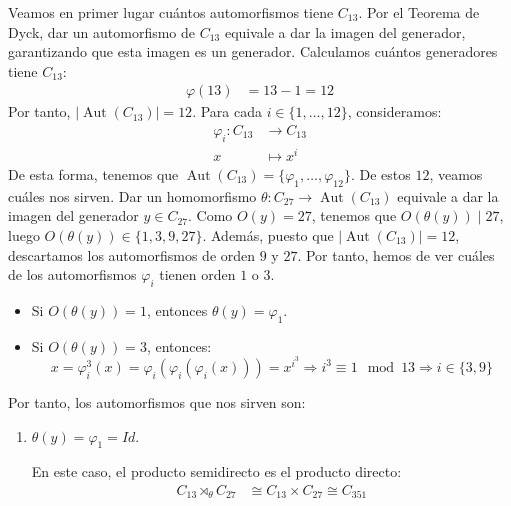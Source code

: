 \documentclass[12pt]{article}
\DeclareMathOperator{\Aut}{Aut}
\begin{document}
\begin{ejercicio}
\begin{enumerate}
            Veamos en primer lugar cuántos automorfismos tiene $C_{13}$. Por el Teorema de Dyck, dar un automorfismo de $C_{13}$ equivale a dar la imagen del generador, garantizando que esta imagen es un generador. Calculamos cuántos generadores tiene $C_{13}$:
            \begin{align*}
                \varphi(13) & = 13-1 = 12
            \end{align*}
            Por tanto, $|\Aut(C_{13})|=12$. Para cada $i\in \{1,\ldots,12\}$, consideramos:
            \begin{align*}
                \varphi_i:C_{13} & \to C_{13} \\
                x & \mapsto x^i
            \end{align*}
            De esta forma, tenemos que $\Aut(C_{13})=\{\varphi_1,\ldots,\varphi_{12}\}$. De estos $12$, veamos cuáles nos sirven. Dar un homomorfismo $\theta:C_{27}\to \Aut(C_{13})$ equivale a dar la imagen del generador $y\in C_{27}$. Como $O(y)=27$, tenemos que $O(\theta(y))\mid 27$, luego $O(\theta(y))\in \{1,3,9,27\}$.  Además, puesto que $|\Aut(C_{13})|=12$, descartamos los automorfismos de orden $9$ y $27$. Por tanto, hemos de ver cuáles de los automorfismos $\varphi_i$ tienen orden $1$ o $3$.
            \begin{itemize}
                \item Si $O(\theta(y))=1$, entonces $\theta(y)=\varphi_1$.
                \item Si $O(\theta(y))=3$, entonces:
                \begin{equation*}
                    x = \varphi_i^3(x) = \varphi_i(\varphi_i(\varphi_i(x))) = x^{i^3}
                    \Longrightarrow i^3 \equiv 1 \mod 13
                    \Longrightarrow i\in \{3,9\}
                \end{equation*}
            \end{itemize}

            Por tanto, los automorfismos que nos sirven son:
            \begin{enumerate}
                \item $\theta(y)=\varphi_1=Id$.
                
                En este caso, el producto semidirecto es el producto directo:
                \begin{align*}
                    C_{13} \rtimes_{\theta} C_{27} & \cong C_{13} \times C_{27} \cong C_{351}
                \end{align*}


\end{enumerate}
\end{enumerate}
\end{ejercicio}
\end{document}
